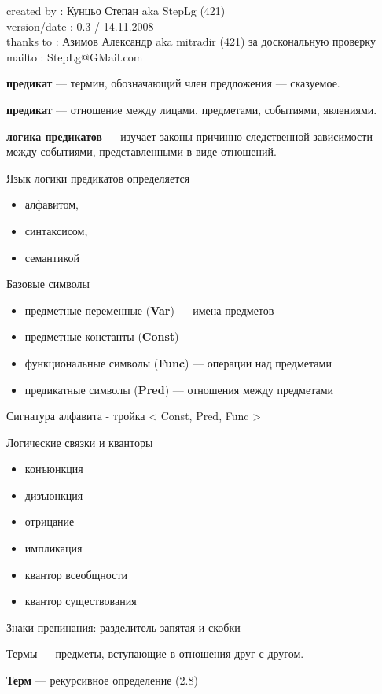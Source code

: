 \documentclass[a4paper,12pt]{article}
\begin{document}
created by : Кунцьо Степан aka StepLg (421) \\
version/date : 0.3 / 14.11.2008 \\
thanks to : Азимов Александр aka mitradir (421) за доскональную проверку \\
mailto : StepLg@GMail.com

\textbf{предикат} --- термин, обозначающий член предложения --- сказуемое.

\textbf{предикат} --- отношение между лицами, предметами, событиями, явлениями.

\textbf{логика предикатов} --- изучает законы причинно-следственной зависимости между событиями, представленными в виде отношений.

Язык логики предикатов определяется
\begin{itemize}
 \item алфавитом,
 \item синтаксисом,
 \item семантикой
\end{itemize}

Базовые символы
\begin{itemize}
 \item предметные переменные (\textbf{Var}) --- имена предметов
 \item предметные константы (\textbf{Const}) ---
 \item функциональные символы (\textbf{Func}) --- операции над предметами
 \item предикатные символы (\textbf{Pred}) --- отношения между предметами
\end{itemize}

Сигнатура алфавита - тройка < Const, Pred, Func >

Логические связки и кванторы
\begin{itemize}
 \item конъюнкция
 \item дизъюнкция
 \item отрицание
 \item импликация
 \item квантор всеобщности
 \item квантор существования
\end{itemize}

Знаки препинания: разделитель запятая и скобки

Термы --- предметы, вступающие в отношения друг с другом.

\textbf{Терм} --- рекурсивное определение (2.8)
\end{document}
